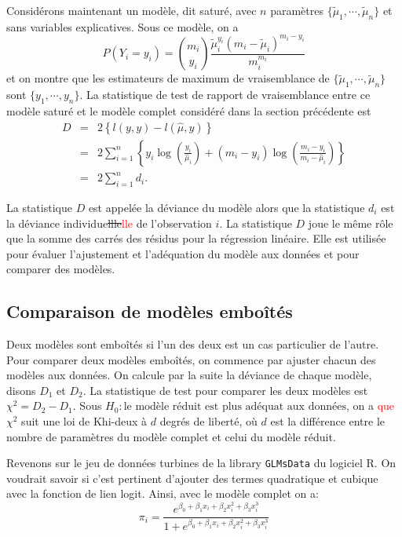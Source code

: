 \documentclass[11pt]{article}
\begin{document}
Considérons maintenant un modèle, dit saturé, avec $n$ paramètres $\{\tilde \mu_1, \cdots, \tilde \mu_n\}$ et sans variables explicatives. Sous ce modèle, on a $$P(Y_i=y_i)= \binom{m_i}{y_i} \frac{\tilde \mu_i^{y_i}(m_i-\tilde \mu_i)^{m_i-y_i}}{m_i^{m_i}}$$ et on montre que les estimateurs de maximum de vraisemblance de $\{\tilde \mu_1, \cdots, \tilde \mu_n\}$ sont $\{y_1,\cdots,y_n\}$. La statistique de test de rapport de vraisemblance entre ce modèle saturé et le modèle complet considéré dans la section précédente est 
\begin{eqnarray*}
D &=& 2\left\{  l(y,y)-l(\hat \mu,y) \right\}\\
&=& 2 \sum_{i=1}^n \left\{y_i \log\left(\frac{y_i}{\hat\mu_i}\right) + (m_i-y_i) \log\left(\frac{m_i-y_i}{m_i-\hat\mu_i}\right)\right\} \\
&=& 2  \sum_{i=1}^n d_i.
\end{eqnarray*}

\noindent La statistique $D$ est appelée la déviance du modèle alors que la statistique $d_i$ est la déviance individue\sout{llle}\textcolor{red}{lle} de l'observation $i$. La statistique $D$ joue le m\^eme r\^ole que la somme des carrés des résidus pour la régression linéaire. Elle est utilisée pour évaluer l'ajustement et l'adéquation du modèle aux données et pour comparer des modèles.

\subsection{Comparaison de modèles embo\^ités}

Deux modèles sont embo\^ités si l'un des deux est un cas particulier de l'autre. Pour comparer deux modèles embo\^ités, on commence par ajuster chacun des modèles aux données. On calcule par la suite la déviance de chaque modèle, disons $D_1$ et $D_2$. La statistique de test pour comparer les deux modèles est $\chi^2 = D_2-D_1$. Sous $H_0:\mbox{le modèle réduit est plus adéquat aux données}$, on a \textcolor{red}{que }$\chi^2$ suit une loi de Khi-deux \`a $d$ degrés de liberté, où $d$ est la différence entre le nombre de paramètres du modèle complet et celui du modèle réduit. 

\noindent Revenons sur le jeu de données \textsf{turbines} de la library \texttt{GLMsData} du logiciel \textrm{R}. On voudrait savoir si c'est pertinent d'ajouter des termes quadratique et cubique avec la fonction de lien logit. Ainsi, avec le modèle complet on a:
$$\pi_i = \frac{e^{\beta_0+\beta_1 x_i + \beta_2 x_i^2 + \beta_3 x_i^3}}{1+e^{\beta_0+\beta_1 x_i + \beta_2 x_i^2 + \beta_3 x_i^3}}$$
\end{document}
